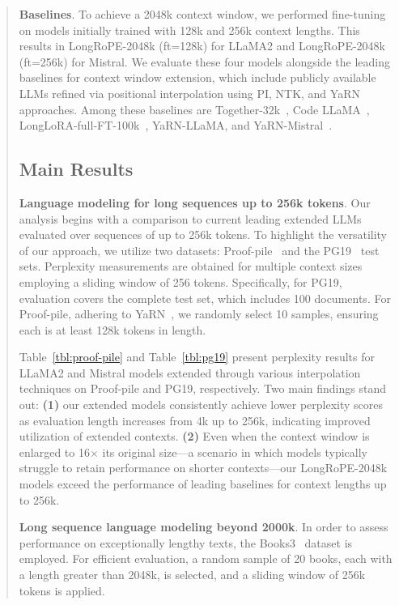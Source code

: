 \begin{abstract}
\textbf{Baselines}. To achieve a 2048k context window, we performed fine-tuning on models initially trained with 128k and 256k context lengths. This results in LongRoPE-2048k (ft=128k) for LLaMA2 and LongRoPE-2048k (ft=256k) for Mistral. We evaluate these four models alongside the leading baselines for context window extension, which include publicly available LLMs refined via positional interpolation using PI, NTK, and YaRN approaches. Among these baselines are Together-32k~\cite{together}, Code LLaMA~\cite{codellama}, LongLoRA-full-FT-100k~\cite{longlora}, YaRN-LLaMA, and YaRN-Mistral~\cite{yarn}.

\subsection{Main Results}

\label{sec:mainresult}
\textbf{Language modeling for long sequences up to 256k tokens}. Our analysis begins with a comparison to current leading extended LLMs evaluated over sequences of up to 256k tokens. To highlight the versatility of our approach, we utilize two datasets: Proof-pile~\cite{pg19} and the PG19~\cite{pile} test sets. Perplexity measurements are obtained for multiple context sizes employing a sliding window of 256 tokens. Specifically, for PG19, evaluation covers the complete test set, which includes 100 documents. For Proof-pile, adhering to YaRN~\cite{yarn}, we randomly select 10 samples, ensuring each is at least 128k tokens in length.

Table~\ref{tbl:proof-pile} and Table~\ref{tbl:pg19} present perplexity results for LLaMA2 and Mistral models extended through various interpolation techniques on Proof-pile and PG19, respectively. Two main findings stand out: \textbf{(1)} our extended models consistently achieve lower perplexity scores as evaluation length increases from 4k up to 256k, indicating improved utilization of extended contexts. \textbf{(2)} Even when the context window is enlarged to 16$\times$ its original size—a scenario in which models typically struggle to retain performance on shorter contexts—our LongRoPE-2048k models exceed the performance of leading baselines for context lengths up to 256k.

\textbf{Long sequence language modeling beyond 2000k}. In order to assess performance on exceptionally lengthy texts, the Books3~\cite{pile} dataset is employed. For efficient evaluation, a random sample of 20 books, each with a length greater than 2048k, is selected, and a sliding window of 256k tokens is applied.


\end{abstract}
